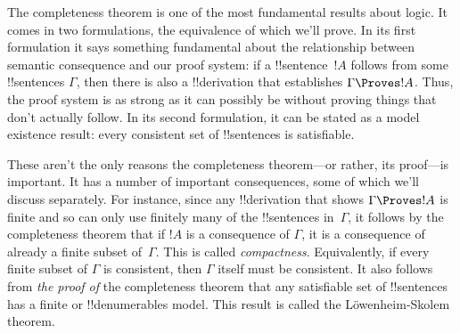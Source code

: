 \documentclass[../../include/open-logic-section]{subfiles}
\begin{document}

The completeness theorem is one of the most fundamental results about
logic.  It comes in two formulations, the equivalence of which we'll
prove. In its first formulation it says something fundamental about
the relationship between semantic consequence and our proof system: if
a !!{sentence}~$!A$ follows from some !!{sentence}s $\Gamma$, then
there is also a !!{derivation} that establishes $\Gamma \Proves !A$.
Thus, the proof system is as strong as it can possibly be without
proving things that don't actually follow.  In its second formulation,
it can be stated as a model existence result: every consistent set of
!!{sentence}s is satisfiable.

These aren't the only reasons the completeness theorem---or rather,
its proof---is important. It has a number of important consequences,
some of which we'll discuss separately.  For instance, since any
!!{derivation} that shows $\Gamma \Proves !A$ is finite and so can
only use finitely many of the !!{sentence}s in~$\Gamma$, it follows by
the completeness theorem that if $!A$ is a consequence of $\Gamma$, it
is a consequence of already a finite subset of~$\Gamma$.  This is
called \emph{compactness}.  Equivalently, if every finite subset of
$\Gamma$ is consistent, then $\Gamma$ itself must be consistent.  It
also follows from \emph{the proof of} the completeness theorem that
any satisfiable set of !!{sentence}s has a finite or !!{denumerable}s
model. This result is called the L\"owenheim-Skolem theorem.
\end{document}
